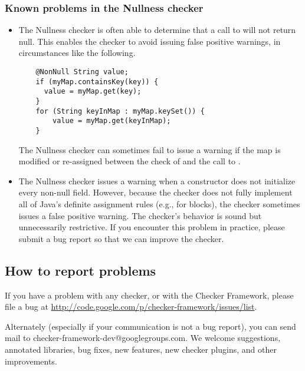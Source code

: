 \subsubsection{Known problems in the Nullness checker}

\begin{itemize}
\item
  The Nullness checker is often able to determine that a call to
   will not return null.  This enables the checker to avoid
  issuing false positive warnings, in circumstances like the following.

\begin{Verbatim}
    @NonNull String value;
    if (myMap.containsKey(key)) {
      value = myMap.get(key);
    }
    for (String keyInMap : myMap.keySet()) {
        value = myMap.get(keyInMap);
    }
\end{Verbatim}

  The Nullness checker can sometimes fail to issue a warning if the map is
  modified or re-assigned between the check of  and the
  call to .



\item 
  The Nullness checker issues a warning when a constructor does not
  initialize every non-null field.  However, because the checker does not
  fully implement all of Java's definite assignment rules (e.g., for
   blocks), the checker sometimes issues a false positive
  warning.  The checker's behavior is sound but unnecessarily restrictive.
  If you encounter this problem in practice, please submit a bug report so
  that we can improve the checker.

\end{itemize}



\subsection{How to report problems\label{reporting-bugs}}

If you have a problem with any checker, or with the Checker Framework,
please file a bug at 
\url{http://code.google.com/p/checker-framework/issues/list}.

Alternately (especially if your communication is not a bug report), you can
send mail to checker-framework-dev@googlegroups.com.
We welcome suggestions, annotated libraries, bug fixes, new
features, new checker plugins, and other improvements.

